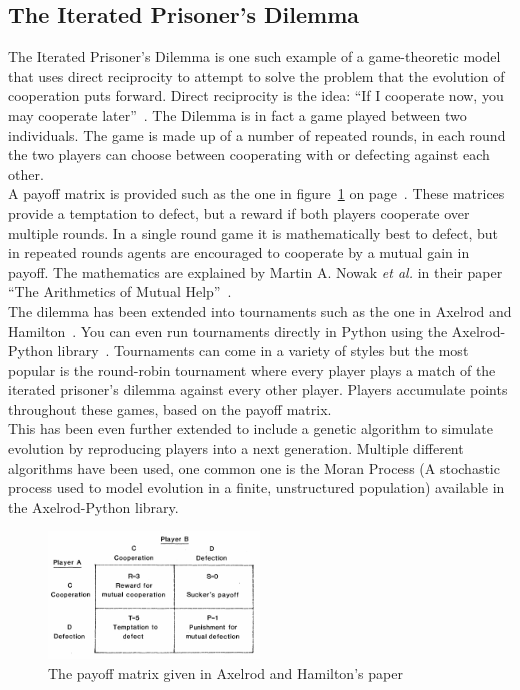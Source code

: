 \documentclass[twoside,twocolumn]{article}
\begin{document}
\subsection{The Iterated Prisoner's Dilemma}
The Iterated Prisoner's Dilemma is one such example of a game-theoretic model that uses direct reciprocity to attempt to solve the problem that the evolution of cooperation puts forward. Direct reciprocity is the idea: ``If I cooperate now, you may cooperate later''~\cite{five_rules_coop}. The Dilemma is in fact a game played between two individuals. The game is made up of a number of repeated rounds, in each round the two players can choose between cooperating with or defecting against each other.\\
A payoff matrix is provided such as the one in figure~\ref{fig:payoffmatrix} on page~\pageref{fig:payoffmatrix}. These matrices provide a temptation to defect, but a reward if both players cooperate over multiple rounds. In a single round game it is mathematically best to defect, but in repeated rounds agents are encouraged to cooperate by a mutual gain in payoff. The mathematics are explained by Martin A. Nowak \textit{et al.} in their paper ``The Arithmetics of Mutual Help''~\cite{arithmetics_of_mutual_help}.\\
The dilemma has been extended into tournaments such as the one in Axelrod and Hamilton~\cite{evolution_of_cooperation}. You can even run tournaments directly in Python using the Axelrod-Python library~\cite{axelrodproject}. Tournaments can come in a variety of styles but the most popular is the round-robin tournament where every player plays a match of the iterated prisoner's dilemma against every other player. Players accumulate points throughout these games, based on the payoff matrix.\\
This has been even further extended to include a genetic algorithm to simulate evolution by reproducing players into a next generation. Multiple different algorithms have been used, one common one is the Moran Process (A stochastic process used to model evolution in a finite, unstructured population) available in the Axelrod-Python library. 
\begin{figure}
	\includegraphics[width=0.5\textwidth]{payoffmatrix.png}
	\caption{The payoff matrix given in Axelrod and Hamilton's paper~\cite{evolution_of_cooperation}}
	\label{fig:payoffmatrix}
\end{figure}
\end{document}
